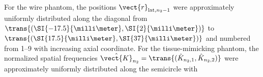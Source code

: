 For
the wire phantom,
the positions
$\vect{r}_{ \text{lat}, n_{2} - 1 }$ were
approximately uniformly distributed along
the diagonal from
$\trans{ ( \SI{-17.5}{\milli\meter}, \SI{2}{\milli\meter} ) }$ to
$\trans{ ( \SI{17.5}{\milli\meter}, \SI{37}{\milli\meter} ) }$ and numbered from
\numrange{1}{9} with
increasing axial coordinate. %
%
%
For
the tissue-mimicking phantom,
the normalized spatial frequencies
$\hat{\vect{K}}_{ n_{2} } = \trans{ ( \hat{K}_{ n_{2}, 1 }, \hat{K}_{ n_{2}, 2 } ) }$ were
approximately uniformly distributed along
the semicircle with
